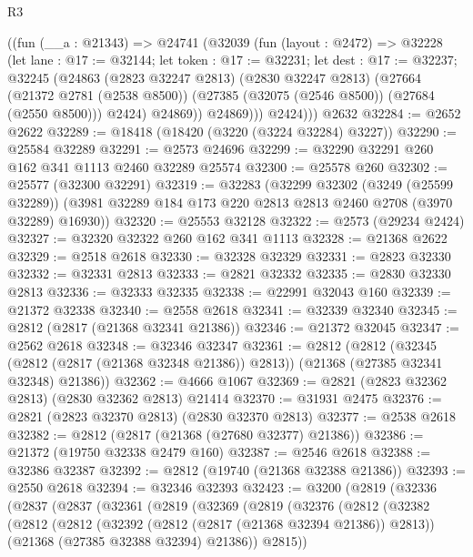 \begin{lexlean}{R3}
\begin{coremodule}
        ((fun (__a : @21343) =>
        @24741
          (@32039
            (fun (layout : @2472) =>
            @32228
              (let lane : @17 := @32144;
              let token : @17 := @32231;
              let dest : @17 := @32237;
              @32245
                (@24863
                  (@2823 @32247 @2813)
                  (@2830 @32247 @2813)
                  (@27664
                    (@21372 @2781 (@2538 @8500))
                    (@27385 (@32075 (@2546 @8500)) (@27684 (@2550 @8500)))
                    @2424)
                  @24869))
              @24869)))
          @2424)))
    @2632
@32284 := @2652 @2622
@32289 := @18418 (@18420 (@3220 (@3224 @32284) @3227))
@32290 := @25584 @32289
@32291 := @2573 @24696
@32299 := @32290 @32291 @260 @162 @341 @1113 @2460 @32289 @25574
@32300 := @25578 @260
@32302 := @25577 (@32300 @32291)
@32319 := @32283
    (@32299
      @32302
      (@3249 (@25599 @32289))
      (@3981 @32289 @184 @173 @220 @2813 @2813 @2460 @2708 (@3970 @32289) @16930))
@32320 := @25553 @32128
@32322 := @2573 (@29234 @2424)
@32327 := @32320 @32322 @260 @162 @341 @1113
@32328 := @21368 @2622
@32329 := @2518 @2618
@32330 := @32328 @32329
@32331 := @2823 @32330
@32332 := @32331 @2813
@32333 := @2821 @32332
@32335 := @2830 @32330 @2813
@32336 := @32333 @32335
@32338 := @22991 @32043 @160
@32339 := @21372 @32338
@32340 := @2558 @2618
@32341 := @32339 @32340
@32345 := @2812 (@2817 (@21368 @32341 @21386))
@32346 := @21372 @32045
@32347 := @2562 @2618
@32348 := @32346 @32347
@32361 := @2812
    (@2812
      (@32345 (@2812 (@2817 (@21368 @32348 @21386)) @2813))
      (@21368 (@27385 @32341 @32348) @21386))
@32362 := @4666 @1067
@32369 := @2821 (@2823 @32362 @2813) (@2830 @32362 @2813) @21414
@32370 := @31931 @2475
@32376 := @2821 (@2823 @32370 @2813) (@2830 @32370 @2813)
@32377 := @2538 @2618
@32382 := @2812 (@2817 (@21368 (@27680 @32377) @21386))
@32386 := @21372 (@19750 @32338 @2479 @160)
@32387 := @2546 @2618
@32388 := @32386 @32387
@32392 := @2812 (@19740 (@21368 @32388 @21386))
@32393 := @2550 @2618
@32394 := @32346 @32393
@32423 := @3200
    (@2819
      (@32336
        (@2837
          (@2837
            (@32361
              (@2819
                (@32369
                  (@2819
                    (@32376
                      (@2812
                        (@32382
                          (@2812
                            (@2812
                              (@32392 (@2812 (@2817 (@21368 @32394 @21386)) @2813))
                              (@21368 (@27385 @32388 @32394) @21386))
                            @2815))

\end{coremodule}
\end{lexlean}
